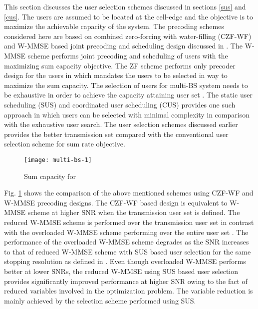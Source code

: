 ﻿
This section discusses the user selection schemes discussed in sections \ref{sus} and \ref{cus}. The users are assumed to be located at the cell-edge and the objective is to maximize the achievable capacity of the system. The precoding schemes considered here are based on combined zero-forcing with water-filling (CZF-WF) and W-MMSE based joint precoding and scheduling design discussed in \cite{wmmse_shi}. The W-MMSE scheme performs joint precoding and scheduling of users with the maximizing sum capacity objective. The ZF scheme performs only precoder design for the users in  which mandates the users to be selected in way to maximize the sum capacity. The selection of users for multi-BS system needs to be exhaustive in order to achieve the capacity attaining user set . The static user scheduling (SUS) and coordinated user scheduling (CUS) provides one such approach in which users can be selected with minimal complexity in comparison with the exhaustive user search. The user selection schemes discussed earlier provides the better transmission set compared with the conventional user selection scheme for sum rate objective.
\begin{figure}[hb]
\centering
\texttt{[image: multi-bs-1]}
\caption[short]{Sum capacity for }
\label{multi-bs-f1}
\end{figure}

Fig. \ref{multi-bs-f1} shows the comparison of the above mentioned schemes using CZF-WF and W-MMSE precoding designs. The CZF-WF based design is equivalent to W-MMSE scheme at higher SNR when the transmission user set  is defined. The reduced W-MMSE scheme is performed over the transmission user set  in contrast with the overloaded W-MMSE scheme performing over the entire user set . The performance of the overloaded W-MMSE scheme degrades as the SNR increases to that of reduced W-MMSE scheme with SUS based user selection for the same stopping resolution \me{\epsilon} as defined in \cite{wmmse_shi}. Even though overloaded W-MMSE performs better at lower SNRs, the reduced W-MMSE using SUS based user selection provides significantly improved performance at higher SNR owing to the fact of reduced variables involved in the optimization problem. The variable reduction is mainly achieved by the selection scheme performed using SUS.


